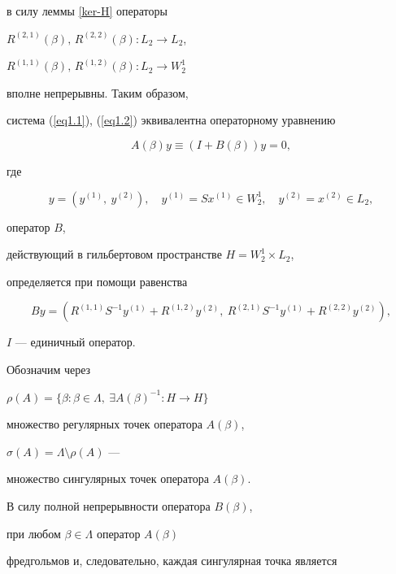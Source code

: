 в силу леммы \ref{ker-H} операторы 


$R^{(2,1)}(\beta),\,R^{(2,2)}(\beta): L_2 \to L_2$,


$R^{(1,1)}(\beta),\, R^{(1,2)}(\beta): L_2 \to W_2^1$


вполне непрерывны. Таким образом,


система (\ref{eq1.1}), (\ref{eq1.2}) эквивалентна операторному уравнению 


\begin{equation}


\label{eq-f}


A(\beta)y \equiv (I+B(\beta))y = 0,


\end{equation}


где


$$


y=(y^{(1)},\ y^{(2)}),


\quad y^{(1)}=Sx^{(1)} \in W_2^1,\quad y^{(2)}=x^{(2)} \in L_2,


$$


оператор $B$,


действующий в гильбертовом пространстве $H=W_2^1 \times L_2$,


определяется при помощи равенства 


\begin{equation}


\label{op-B}


By=(R^{(1,1)} S^{-1} y^{(1)} + R^{(1,2)} y^{(2)},


\ R^{(2,1)} S^{-1} y^{(1)} + R^{(2,2)} y^{(2)}),


\end{equation}


$I$ --- единичный оператор.





Обозначим через


$\rho(A)=\{\beta:\beta\in \Lambda,\ \exists A(\beta)^{-1}:H\to H\}$


множество регулярных точек оператора $A(\beta)$,


$\sigma(A)=\Lambda\setminus \rho(A)$ ---


множество сингулярных точек оператора $A(\beta)$. 


В силу полной непрерывности оператора $B(\beta)$,


при любом $\beta \in \Lambda$ оператор $A(\beta)$


фредгольмов и, следовательно, каждая сингулярная точка является


